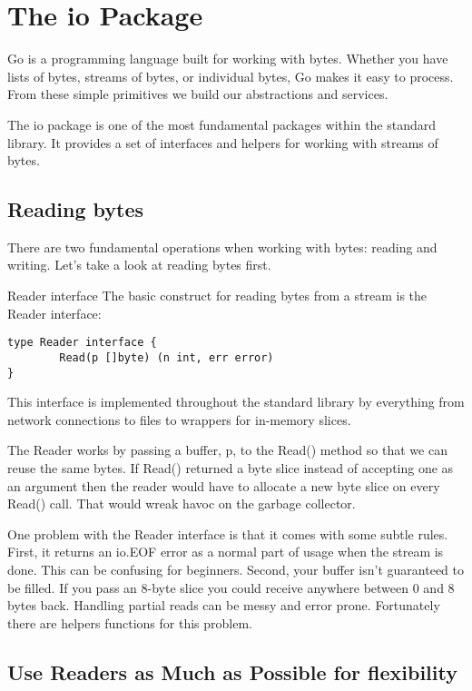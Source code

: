 \newfontfamily{}


\chapter{The io Package}

Go is a programming language built for working with bytes. Whether you have lists of bytes, streams of bytes, or individual bytes, Go makes it easy to process. From these simple primitives we build our abstractions and services.

The io package is one of the most fundamental packages within the standard library. It provides a set of interfaces and helpers for working with streams of bytes.

\section{Reading bytes}

There are two fundamental operations when working with bytes: reading and writing. Let’s take a look at reading bytes first.

Reader interface
The basic construct for reading bytes from a stream is the Reader interface:

\begin{verbatim}
type Reader interface {
        Read(p []byte) (n int, err error)
}
\end{verbatim}

This interface is implemented throughout the standard library by everything from network connections to files to wrappers for in-memory slices.

The Reader works by passing a buffer, p, to the Read() method so that we can reuse the same bytes. If Read() returned a byte slice instead of accepting one as an argument then the reader would have to allocate a new byte slice on every Read() call. That would wreak havoc on the garbage collector.

One problem with the Reader interface is that it comes with some subtle rules. First, it returns an io.EOF error as a normal part of usage when the stream is done. This can be confusing for beginners. Second, your buffer isn’t guaranteed to be filled. If you pass an 8-byte slice you could receive anywhere between 0 and 8 bytes back. Handling partial reads can be messy and error prone. Fortunately there are helpers functions for this problem.


\section{Use Readers as Much as Possible for flexibility}

